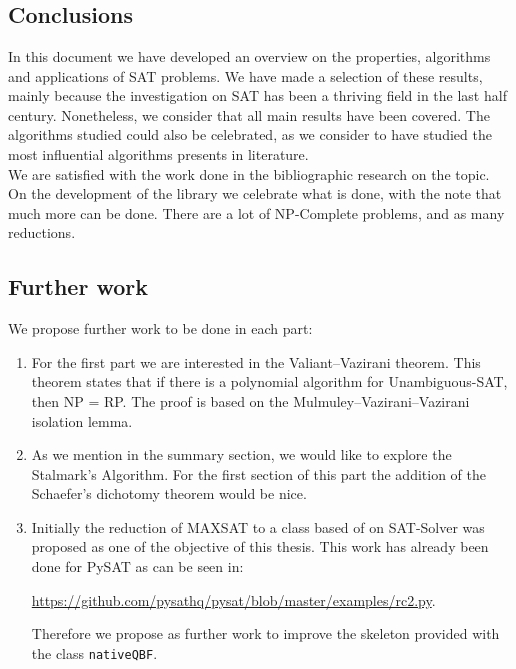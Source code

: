 

\chapter*{}
\section*{Conclusions} 


In this document we have developed an overview on the properties, algorithms and applications of SAT problems. We have made a selection of these results, mainly because the investigation on SAT has been a thriving field in the last half century. Nonetheless, we consider that all main results have been covered. The algorithms studied could also be celebrated, as we consider to have studied the most influential algorithms presents in literature.\\

We are satisfied with the work done in the bibliographic research on the topic. On the development of the library we celebrate what is done, with the note that much more can be done. There are a lot of NP-Complete problems, and as many reductions.


\section*{Further work}

We propose further work to be done in each part:
\begin{enumerate}
\item For the first part we are interested in the Valiant–Vazirani theorem. This theorem states that if there is a polynomial algorithm for Unambiguous-SAT, then NP = RP. The proof is based on the Mulmuley–Vazirani–Vazirani isolation lemma.
\item As we mention in the summary section, we would like to explore the Stalmark's Algorithm. For the first section of this part the addition of the Schaefer's dichotomy theorem would be nice. 
\item Initially the reduction of MAXSAT to a class based of on SAT-Solver was proposed as one of the objective of this thesis. This work has already been done for PySAT as can be seen in:
  \begin{center}
    \url{https://github.com/pysathq/pysat/blob/master/examples/rc2.py}.
  \end{center}

  Therefore we propose as further work to improve the skeleton provided with the class \texttt{nativeQBF}.   
\end{enumerate}